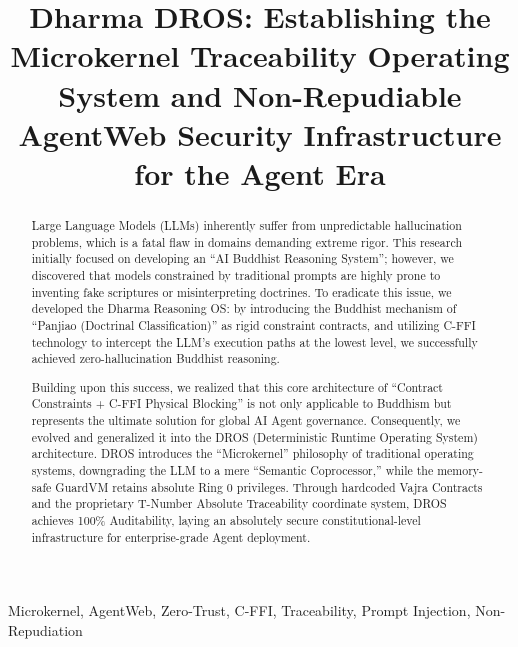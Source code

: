 \documentclass[conference]{IEEEtran}
\begin{document}
\title{Dharma DROS: Establishing the Microkernel Traceability Operating System and Non-Repudiable AgentWeb Security Infrastructure for the Agent Era}

\author{
}

\maketitle

\begin{abstract}
Large Language Models (LLMs) inherently suffer from unpredictable hallucination problems, which is a fatal flaw in domains demanding extreme rigor. This research initially focused on developing an ``AI Buddhist Reasoning System''; however, we discovered that models constrained by traditional prompts are highly prone to inventing fake scriptures or misinterpreting doctrines. To eradicate this issue, we developed the Dharma Reasoning OS: by introducing the Buddhist mechanism of ``Panjiao (Doctrinal Classification)'' as rigid constraint contracts, and utilizing C-FFI technology to intercept the LLM's execution paths at the lowest level, we successfully achieved zero-hallucination Buddhist reasoning.

Building upon this success, we realized that this core architecture of ``Contract Constraints + C-FFI Physical Blocking'' is not only applicable to Buddhism but represents the ultimate solution for global AI Agent governance. Consequently, we evolved and generalized it into the DROS (Deterministic Runtime Operating System) architecture. DROS introduces the ``Microkernel'' philosophy of traditional operating systems, downgrading the LLM to a mere ``Semantic Coprocessor,'' while the memory-safe GuardVM retains absolute Ring 0 privileges. Through hardcoded Vajra Contracts and the proprietary T-Number Absolute Traceability coordinate system, DROS achieves 100\% Auditability, laying an absolutely secure constitutional-level infrastructure for enterprise-grade Agent deployment.
\end{abstract}

\begin{IEEEkeywords}
Microkernel, AgentWeb, Zero-Trust, C-FFI, Traceability, Prompt Injection, Non-Repudiation
\end{IEEEkeywords}
\end{document}
